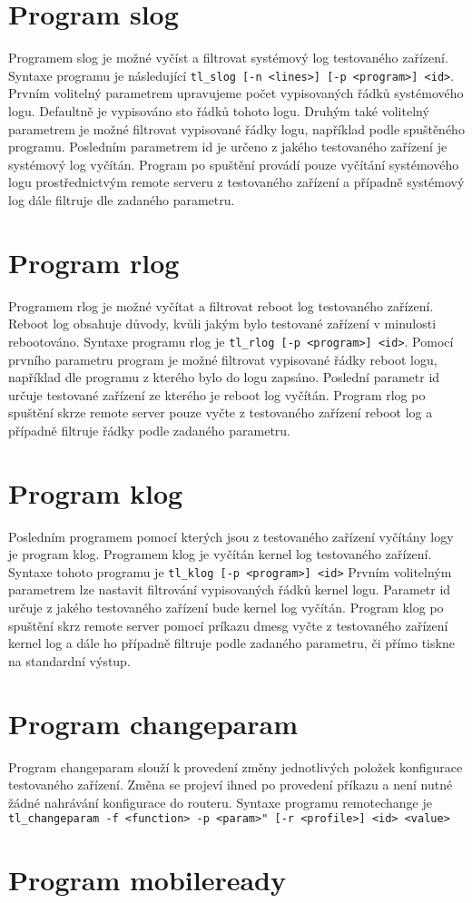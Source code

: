 \section{Program slog}
Programem slog je možné vyčíst a filtrovat systémový log testovaného zařízení. Syntaxe programu je následující \texttt{tl\_slog [-n <lines>] [-p <program>] <id>}. Prvním volitelný parametrem upravujeme počet vypisovaných řádků systémového logu. Defaultně je vypisováno sto řádků tohoto logu. Druhým také volitelný parametrem je možné filtrovat vypisované řádky logu, například podle spuštěného programu. Posledním parametrem id je určeno z jakého testovaného zařízení je systémový log vyčítán. Program po spuštění provádí pouze vyčítání systémového logu prostřednictvým remote serveru z testovaného zařízení a případně systémový log dále filtruje dle zadaného parametru.

\section{Program rlog}
Programem rlog je možné vyčítat a filtrovat reboot log testovaného zařízení. Reboot log obsahuje důvody, kvůli jakým bylo testované zařízení v minulosti rebootováno. Syntaxe programu rlog je \texttt{tl\_rlog [-p <program>] <id>}. Pomocí prvního parametru program je možné filtrovat vypisované řádky reboot logu, například dle programu z kterého bylo do logu zapsáno. Poslední parametr id určuje testované zařízení ze kterého je reboot log vyčítán. Program rlog po spuštění skrze remote server pouze vyčte z testovaného zařízení reboot log a případně filtruje řádky podle zadaného parametru.

\section{Program klog}
Posledním programem pomocí kterých jsou z testovaného zařízení vyčítány logy je program klog. Programem klog je vyčítán kernel log testovaného zařízení. Syntaxe tohoto programu je \texttt{tl\_klog [-p <program>] <id>} Prvním volitelným parametrem lze nastavit filtrování vypisovaných řádků kernel logu. Parametr id určuje z jakého testovaného zařízení bude kernel log vyčítán. Program klog po spuštění skrz remote server pomocí príkazu dmesg vyčte z testovaného zařízení kernel log a dále ho případně filtruje podle zadaného parametru, či přímo tiskne na standardní výstup.

\section{Program changeparam}
Program changeparam slouží k provedení změny jednotlivých položek konfigurace testovaného zařízení. Změna se projeví ihned po provedení příkazu a není nutné žádné nahrávání konfigurace do routeru. Syntaxe programu remotechange je \texttt{tl\_changeparam -f <function> -p <param>" [-r <profile>] <id> <value>}


\section{Program mobileready}

\endinput
